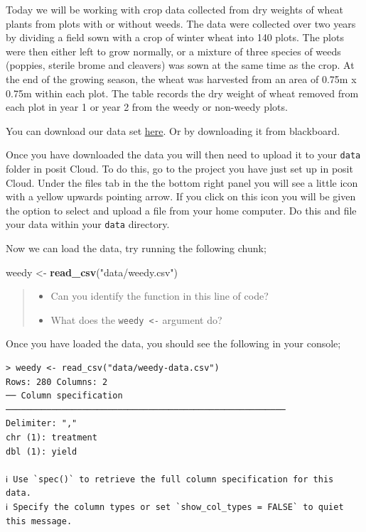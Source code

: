 \documentclass[
]{book}
\newenvironment{Shaded}{\begin{snugshade}}{\end{snugshade}}
\newcommand{\FunctionTok}[1]{\textcolor[rgb]{0.13,0.29,0.53}{\textbf{#1}}}
\newcommand{\NormalTok}[1]{#1}
\newcommand{\OtherTok}[1]{\textcolor[rgb]{0.56,0.35,0.01}{#1}}
\newcommand{\StringTok}[1]{\textcolor[rgb]{0.31,0.60,0.02}{#1}}
\providecommand{\tightlist}{%
  \setlength{\itemsep}{0pt}\setlength{\parskip}{0pt}}
\begin{document}
Today we will be working with crop data collected from dry weights of wheat plants from plots with or without weeds. The data were collected over two years by dividing a field sown with a crop of winter wheat into 140 plots. The plots were then either left to grow normally, or a mixture of three species of weeds (poppies, sterile brome and cleavers) was sown at the same time as the crop. At the end of the growing season, the wheat was harvested from an area of 0.75m x 0.75m within each plot. The table records the dry weight of wheat removed from each plot in year 1 or year 2 from the weedy or non-weedy plots.

You can download our data set \href{https://drive.google.com/uc?export=download\&id=1qgIqvW56dSHb0dq07ZMU43POA0jkjuuR}{here}. Or by downloading it from blackboard.

Once you have downloaded the data you will then need to upload it to your \texttt{data} folder in posit Cloud. To do this, go to the project you have just set up in posit Cloud. Under the files tab in the the bottom right panel you will see a little icon with a yellow upwards pointing arrow. If you click on this icon you will be given the option to select and upload a file from your home computer. Do this and file your data within your \texttt{data} directory.

Now we can load the data, try running the following chunk;

\begin{Shaded}
\begin{Highlighting}[]
\NormalTok{weedy }\OtherTok{\textless{}{-}} \FunctionTok{read\_csv}\NormalTok{(}\StringTok{"data/weedy.csv"}\NormalTok{)}
\end{Highlighting}
\end{Shaded}

\begin{quote}
\begin{itemize}
\tightlist
\item
  Can you identify the function in this line of code?
\item
  What does the \texttt{weedy\ \textless{}-} argument do?
\end{itemize}
\end{quote}

Once you have loaded the data, you should see the following in your console;

\begin{verbatim}
> weedy <- read_csv("data/weedy-data.csv")
Rows: 280 Columns: 2                                                         
── Column specification ───────────────────────────────────────────────────────
Delimiter: ","
chr (1): treatment
dbl (1): yield

ℹ Use `spec()` to retrieve the full column specification for this data.
ℹ Specify the column types or set `show_col_types = FALSE` to quiet this message.
\end{verbatim}
\end{document}
